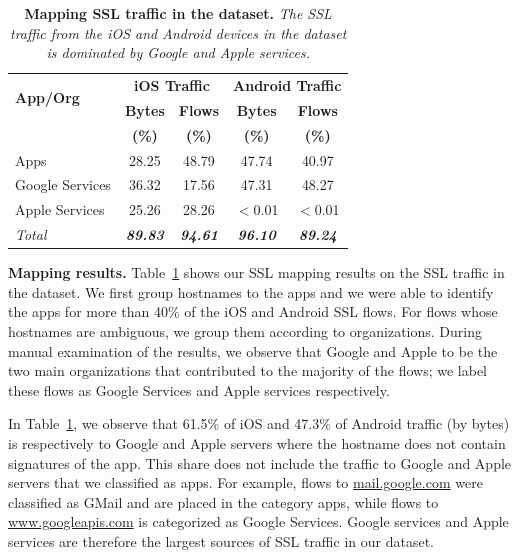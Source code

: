 \begin{table}
\centering
\begin{small}
\begin{tabular}{|p{}|c|c|c|c|}
\hline
\multirow{2}{*}{\bf App/Org} & \multicolumn{2}{c|}{\bf iOS Traffic} &  \multicolumn{2}{c|}{\bf Android Traffic} \tabularnewline
\cline{2-5}
                              & {\bf Bytes}  & {\bf Flows} & {\bf Bytes} & {\bf Flows}   \tabularnewline
                              & {\bf (\%)}  & {\bf (\%)} & {\bf (\%)} & {\bf (\%)}   \tabularnewline
\hline

Apps            & 28.25 & 48.79 & 47.74 & 40.97 \tabularnewline
\hline
Google Services & 36.32 & 17.56 & 47.31 & 48.27 \tabularnewline
\hline
Apple Services  & 25.26 & 28.26 & $<$0.01 & $<$0.01 \tabularnewline
\hline
{\emph{Total}}  & {\em \bf 89.83} & {\em\bf 94.61} & {\em\bf  96.10}  &  {\em\bf  89.24} \tabularnewline
\hline
\end{tabular}
\end{small}
\caption{\textbf{Mapping SSL traffic in the \mobWild dataset.} \emph{The SSL traffic from the iOS and Android devices in the \mobWild dataset is dominated by Google and Apple services.}}
\label{tab:classify-ssl-traffic}
\end{table}

\noindent\textbf{Mapping results.} 
Table~\ref{tab:classify-ssl-traffic} shows our SSL mapping results on the SSL traffic in the \mobWild dataset. 
We first group hostnames to the apps and we were able to identify the apps for more than 40\% of the iOS and Android SSL flows.
For flows whose hostnames are ambiguous, we group them according to organizations.
During manual examination of the results, we observe that Google and Apple to be the two main organizations that contributed to the majority of the flows; we label these flows as Google Services and Apple services respectively. 

In Table~\ref{tab:classify-ssl-traffic}, we observe that 61.5\% of iOS and 47.3\% of Android traffic (by bytes) is respectively 
to Google and Apple servers where the hostname does not contain signatures of the app.
This share does not include the traffic to Google and Apple servers that we classified as apps.
For example, flows to \url{mail.google.com} were classified as GMail and are placed in the category apps, while flows to \url{www.googleapis.com} is categorized as Google Services. 
Google services and Apple services are therefore the largest sources of SSL traffic in our \mobWild dataset.

